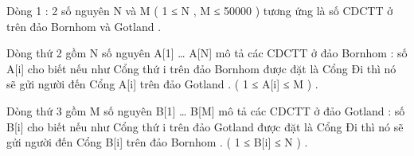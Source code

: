 Dòng 1 : 2 số nguyên N và M ( 1 ≤ N , M ≤ 50000 ) tương ứng là số CDCTT ở trên đảo Bornhom và Gotland .


Dòng thứ 2 gồm N số nguyên A[1] … A[N] mô tả các CDCTT ở đảo Bornhom : số A[i] cho biết nếu như Cổng thứ i trên đảo Bornhom được đặt là Cổng Đi thì nó sẽ gửi người đến Cổng A[i] trên đảo Gotland . ( 1 ≤ A[i] ≤ M ) .


Dòng thứ 3 gồm M số nguyên B[1] … B[M] mô tả các CDCTT ở đảo Gotland : số B[i] cho biết nếu như Cổng thứ i trên đảo Gotland được đặt là Cổng Đi thì nó sẽ gửi người đến Cổng B[i] trên đảo Bornhom . ( 1 ≤ B[i] ≤ N ) .